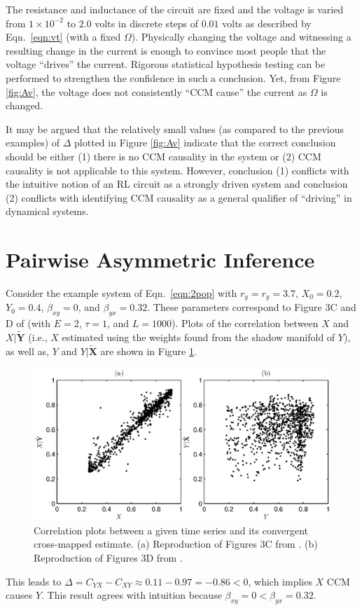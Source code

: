 \documentclass[twocolumn,aps,pre,groupedaddress]{revtex4-1}
\begin{document}
The resistance and inductance of the circuit are fixed and the voltage is varied from $1\times 10^{-2}$ to $2.0$ volts in discrete steps of $0.01$ volts as described by Eqn.\ \ref{eqn:vt} (with a fixed $\Omega$).  Physically changing the voltage and witnessing a resulting change in the current is enough to convince most people that the voltage ``drives'' the current.  Rigorous statistical hypothesis testing can be performed to strengthen the confidence in such a conclusion.  Yet, from Figure \ref{fig:Av}, the voltage does not consistently ``CCM cause'' the current as $\Omega$ is changed. 

It may be argued that the relatively small values (as compared to the previous examples) of $\Delta$ plotted in Figure \ref{fig:Av} indicate that the correct conclusion should be either (1) there is no CCM causality in the system or (2) CCM causality is not applicable to this system.  However, conclusion (1) conflicts with the intuitive notion of an RL circuit as a strongly driven system and conclusion (2) conflicts with identifying CCM causality as a general qualifier of ``driving'' in dynamical systems.

\section{Pairwise Asymmetric Inference}
\label{sec:PAI}

Consider the example system of Eqn.\ \ref{eqn:2pop} with $r_y=r_y=3.7$, $X_0 = 0.2$, $Y_0=0.4$, $\beta_{xy}=0$, and $\beta_{yx}=0.32$.  These parameters correspond to Figure 3C and D of \cite{Sugihara2012} (with $E=2$, $\tau=1$, and $L=1000$).  Plots of the correlation between $X$ and $X|\tilde{\mathbf{Y}}$ (i.e., $X$ estimated using the weights found from the shadow manifold of $Y$), as well as, $Y$ and $Y|\tilde{\mathbf{X}}$ are shown in Figure \ref{fig:Sug3CDredo}.
\begin{figure}[ht]
\includegraphics[scale=0.5]{SugFig3CD.eps} 
\caption{Correlation plots between a given time series and its convergent cross-mapped estimate.  (a) Reproduction of Figures 3C from \cite{Sugihara2012}. (b) Reproduction of Figures 3D from \cite{Sugihara2012}.}
\label{fig:Sug3CDredo}
\end{figure}
This leads to $\Delta=C_{YX}-C_{XY}\approx 0.11 - 0.97 = -0.86 <0$, which implies $X$ CCM causes $Y$.  This result agrees with intuition because $\beta_{xy}=0 < \beta_{yx} = 0.32$.
\end{document}
